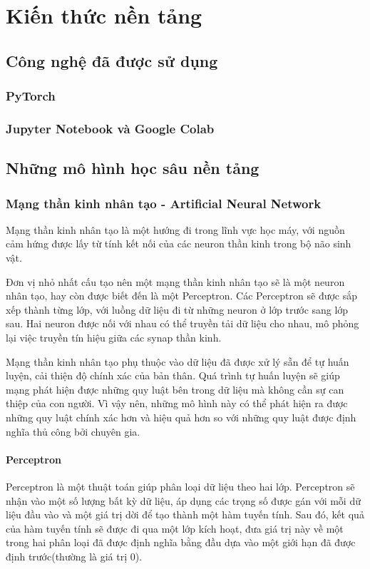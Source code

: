 \chapter{Kiến thức nền tảng}
\section{Công nghệ đã được sử dụng}
\subsection*{PyTorch}
\subsection*{Jupyter Notebook và Google Colab}
\section{Những mô hình học sâu nền tảng}
\subsection{Mạng thần kinh nhân tạo - Artificial Neural Network}
Mạng thần kinh nhân tạo là một hướng đi trong lĩnh vực học máy, với nguồn cảm hứng được lấy từ tính kết nối của các neuron thần kinh trong bộ não sinh vật.

Đơn vị nhỏ nhất cấu tạo nên một mạng thần kinh nhân tạo sẽ là một neuron nhân tạo, hay còn được biết đến là một Perceptron. Các Perceptron sẽ được sắp xếp thành từng lớp, với luồng dữ liệu đi từ những neuron ở lớp trước sang lớp sau. Hai neuron được nối với nhau có thể truyền tải dữ liệu cho nhau, mô phỏng lại việc truyền tín hiệu giữa các synap thần kinh.

Mạng thần kinh nhân tạo phụ thuộc vào dữ liệu đã được xử lý sẵn để tự huấn luyện, cải thiện độ chính xác của bản thân. Quá trình tự huấn luyện sẽ giúp mạng phát hiện được những quy luật bên trong dữ liệu mà không cần sự can thiệp của con người. Vì vậy nên, những mô hình này có thể phát hiện ra được những quy luật chính xác hơn và hiệu quả hơn so với những quy luật được định nghĩa thủ công bởi chuyên gia.
\subsubsection*{Perceptron}
Perceptron là một thuật toán giúp phân loại dữ liệu theo hai lớp. Perceptron sẽ nhận vào một số lượng bất kỳ dữ liệu, áp dụng các trọng số được gán với mỗi dữ liệu đầu vào và một giá trị dời để tạo thành một hàm tuyến tính. Sau đó, kết quả của hàm tuyến tính sẽ được đi qua một lớp kích hoạt, đưa giá trị này về một trong hai phân loại đã được định nghĩa bằng đầu dựa vào một giới hạn đã được định trước(thường là giá trị 0).

